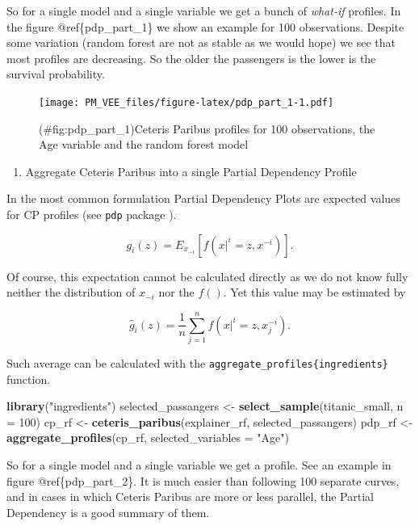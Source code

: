 \documentclass[]{krantz}
\newenvironment{Shaded}{\begin{snugshade}}{\end{snugshade}}
\newcommand{\DataTypeTok}[1]{\textcolor[rgb]{0.13,0.29,0.53}{#1}}
\newcommand{\DecValTok}[1]{\textcolor[rgb]{0.00,0.00,0.81}{#1}}
\newcommand{\KeywordTok}[1]{\textcolor[rgb]{0.13,0.29,0.53}{\textbf{#1}}}
\newcommand{\NormalTok}[1]{#1}
\newcommand{\StringTok}[1]{\textcolor[rgb]{0.31,0.60,0.02}{#1}}
\providecommand{\tightlist}{%
  \setlength{\itemsep}{0pt}\setlength{\parskip}{0pt}}
\theoremstyle{definition}
\theoremstyle{definition}
\theoremstyle{definition}
\theoremstyle{remark}
\begin{document}
So for a single model and a single variable we get a bunch of
\emph{what-if} profiles. In the figure @ref\{pdp\_part\_1\} we show an
example for 100 observations. Despite some variation (random forest are
not as stable as we would hope) we see that most profiles are
decreasing. So the older the passengers is the lower is the survival
probability.

\begin{figure}
\centering
\texttt{[image: PM\_VEE\_files/figure-latex/pdp\_part\_1-1.pdf]}
\caption{(\#fig:pdp\_part\_1)Ceteris Paribus profiles for 100
observations, the Age variable and the random forest model}
\end{figure}

\begin{enumerate}
\def\labelenumi{\arabic{enumi}.}
\setcounter{enumi}{1}
\tightlist
\item
  Aggregate Ceteris Paribus into a single Partial Dependency Profile
\end{enumerate}

In the most common formulation Partial Dependency Plots are expected
values for CP profiles (see \texttt{pdp} package \citep{pdp}).

\[
g_i(z) = E_{x_{-i}}[ f(x|^i = z, x^{-i}) ].
\]

Of course, this expectation cannot be calculated directly as we do not
know fully neither the distribution of \(x_{-i}\) nor the \(f()\). Yet
this value may be estimated by

\[
\hat g_i(z) = \frac{1}{n} \sum_{j=1}^{n} f(x|^i = z, x_j^{-i}).
\]

Such average can be calculated with the
\texttt{aggregate\_profiles\{ingredients\}} function.

\begin{Shaded}
\begin{Highlighting}[]
\KeywordTok{library}\NormalTok{(}\StringTok{"ingredients"}\NormalTok{)}
\NormalTok{selected_passangers <-}\StringTok{ }\KeywordTok{select_sample}\NormalTok{(titanic_small, }\DataTypeTok{n =} \DecValTok{100}\NormalTok{)}
\NormalTok{cp_rf <-}\StringTok{ }\KeywordTok{ceteris_paribus}\NormalTok{(explainer_rf, selected_passangers)}
\NormalTok{pdp_rf <-}\StringTok{ }\KeywordTok{aggregate_profiles}\NormalTok{(cp_rf, }\DataTypeTok{selected_variables =} \StringTok{"Age"}\NormalTok{)}
\end{Highlighting}
\end{Shaded}

So for a single model and a single variable we get a profile. See an
example in figure @ref\{pdp\_part\_2\}. It is much easier than following
100 separate curves, and in cases in which Ceteris Paribus are more or
less parallel, the Partial Dependency is a good summary of them.
\end{document}
